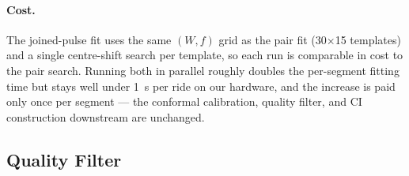 \paragraph{Cost.} The joined-pulse fit uses the same
$(W,f)$ grid as the pair fit (30$\times$15 templates) and a single
centre-shift search per template, so each run is comparable in cost
to the pair search. Running both in parallel roughly doubles the
per-segment fitting time but stays well under 1~s per ride on our
hardware, and the increase is paid only once per segment — the
conformal calibration, quality filter, and CI construction
downstream are unchanged.

\subsection{Quality Filter}
\label{sec:quality-filter}

